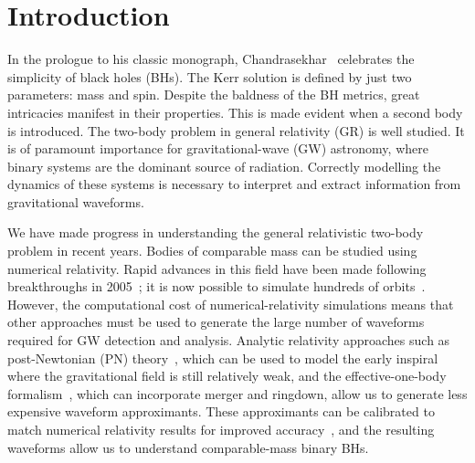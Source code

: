 \documentclass[aps,prd,amsfonts,amssymb,amsmath,nofootinbib,showpacs,superscriptaddress,twocolumn,floatfix]{revtex4-1}
\begin{document}

\maketitle

\section{Introduction}
 
In the prologue to his classic monograph, Chandrasekhar~\cite{Chandrasekhar1992} celebrates the simplicity of black holes (BHs). The Kerr solution is defined by just two parameters: mass and spin. Despite the baldness of the BH metrics, great intricacies manifest in their properties. This is made evident when a second body is introduced. The two-body problem in general relativity (GR) is well studied. It is of paramount importance for gravitational-wave (GW) astronomy, where binary systems are the dominant source of radiation. Correctly modelling the dynamics of these systems is necessary to interpret and extract information from gravitational waveforms.

We have made progress in understanding the general relativistic two-body problem in recent years. Bodies of comparable mass can be studied using numerical relativity. Rapid advances in this field have been made following breakthroughs in 2005~\cite{Pretorius2005,Campanelli2006,Baker2006}; it is now possible to simulate hundreds of orbits~\cite{Szilagyi2015}. However, the computational cost of numerical-relativity simulations means that other approaches must be used to generate the large number of waveforms required for GW detection and analysis. Analytic relativity approaches such as post-Newtonian (PN) theory~\cite{Blanchet2014,Buonanno2009}, which can be used to model the early inspiral where the gravitational field is still relatively weak, and the effective-one-body formalism~\cite{Buonanno1999,Buonanno2000,Damour2009,Barausse2010}, which can incorporate merger and ringdown, allow us to generate less expensive waveform approximants. These approximants can be calibrated to match numerical relativity results for improved accuracy~\cite{Taracchini2014,Pan2014,Husa2015,Khan2015,Schmidt2015}, and the resulting waveforms allow us to understand comparable-mass binary BHs.
\end{document}
